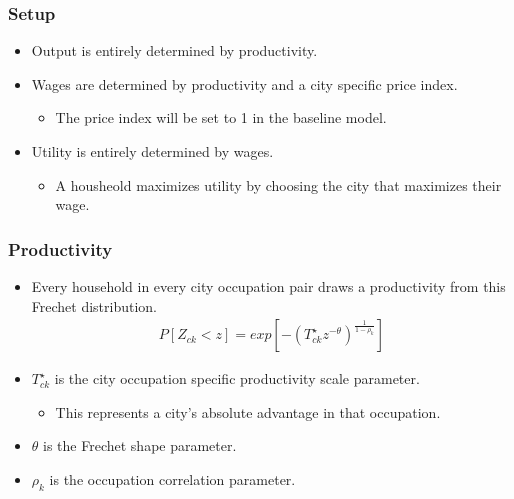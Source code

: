\documentclass[serif, 9pt, aspectratio=32]{beamer}
\begin{document}
\begin{frame}
    \centering
    \frametitle{Setup}
    \begin{itemize}
        \setlength{\itemsep}{3em}
        \item Output is entirely determined by productivity.
        \item Wages are determined by productivity and a city specific price index.
              \begin{itemize}
                  \item The price index will be set to 1 in the baseline model.
              \end{itemize}
        \item Utility is entirely determined by wages.
              \begin{itemize}
                  \item A housheold maximizes utility by choosing the city that maximizes their wage.
              \end{itemize}
    \end{itemize}
\end{frame}

\begin{frame}
    \centering
    \frametitle{Productivity}
    \begin{itemize}
        \setlength{\itemsep}{2em}
        \item Every household in every city occupation pair draws a productivity from this Frechet distribution.
              \vspace{2em}
              \begin{equation}
                  \label{specific_Frechet}
                  \begin{aligned}
                      P[Z_{ck} < z] = exp[-(T_{ck}^{\star} z^{-\theta})^{\frac{1}{1 - \rho_k}}]
                  \end{aligned}
              \end{equation}
    \end{itemize}
    \vspace{3em}
    \begin{itemize}
        \item $T_{ck}^{\star}$ is the city occupation specific productivity scale parameter.
              \begin{itemize}
                  \item This represents a city's absolute advantage in that occupation.
              \end{itemize}
        \item $\theta$ is the Frechet shape parameter.
        \item $\rho_k$ is the occupation correlation parameter.
    \end{itemize}
\end{frame}
\end{document}
